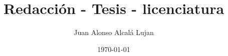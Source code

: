 \usepackage[utf8]{inputenc} %
\usepackage[spanish,english,es-tabla]{babel}
\makeatletter
{}
\makeatother
\usepackage{datetime} %
\usepackage[lmargin=3cm,rmargin=2.54cm,top=2.54cm,bottom=2.54cm]{geometry}

\usepackage{etoolbox}

\title{Redacción - Tesis - licenciatura}
\author{Juan Alonso Alcalá Lujan}
\date{\today}

\usepackage{bm,amsmath,amssymb,graphicx,amsfonts,amsthm}
\usepackage{fancybox} %
\usepackage{float}
\usepackage{array}
\usepackage{comment} %
\usepackage[justification=centering, singlelinecheck=false]{caption}
\usepackage{subcaption} %
\usepackage{url}
\usepackage{lipsum} %
\usepackage[rgb]{xcolor} %
\usepackage{booktabs} %
\usepackage{multicol}
\usepackage{setspace}

\providecommand{\UseTaggingSocket}[2][]{}
\providecommand{\SuspendTagging}[1]{}
\providecommand{\ResumeTagging}[1]{}
\usepackage{tocloft}
\usepackage{chngcntr} %
\usepackage{appendix}
\renewcommand{\contentsname}{Tabla de contenidos}
\renewcommand{\bibname}{Bibliografía}
\renewcommand{\indexname}{Índice de Palabras}
\renewcommand{\figurename}{Imagen}
\renewcommand{\tablename}{TABLA}
\renewcommand{\partname}{Parte}
\renewcommand{\chaptername}{Capítulo}
\renewcommand{\appendixname}{Anexos}
\addto\captionsspanish{\renewcommand{\figurename}{FIGURA}}%
\addto\captionsspanish{\renewcommand{\tablename}{TABLA}}

